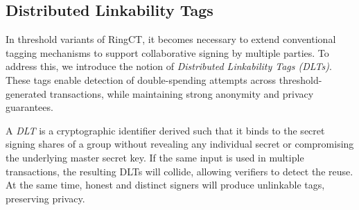 \subsection{Distributed Linkability Tags}
In threshold variants of RingCT, it becomes necessary to extend conventional tagging mechanisms to support collaborative signing by multiple parties. To address this, we introduce the notion of \emph{Distributed Linkability Tags (DLTs)}. These tags enable detection of double-spending attempts across threshold-generated transactions, while maintaining strong anonymity and privacy guarantees.

A \emph{DLT} is a cryptographic identifier derived such that it binds to the secret signing shares of a group without revealing any individual secret or compromising the underlying master secret key. If the same input is used in multiple transactions, the resulting DLTs will collide, allowing verifiers to detect the reuse. At the same time, honest and distinct signers will produce unlinkable tags, preserving privacy.


